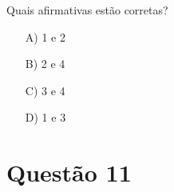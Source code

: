 \documentclass[a4paper, 12pt, openright, oneside, english, brazil, article]{abntex2}
\begin{document}
	Quais afirmativas estão corretas?
	
	\begin{enumerate}
		\item [A)] 1 e 2
		\item [B)] 2 e 4
		\item [C)] 3 e 4
		\item [D)] 1 e 3
	\end{enumerate}
	
	
	\section{Questão 11}
	
	
	
	
	
	
	
\end{document}
